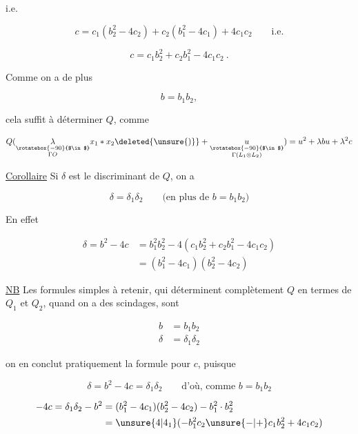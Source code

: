 

i.e. 

\[ c=c_1(b_2^2-4c_2)+c_2(b_1^2-4c_1)+4c_1c_2\qquad\text{i.e.} \]

\[ \boxed{c=c_1b_2^2+c_2b_1^2-4c_1c_2}\ . \]

Comme on a de plus

\[ \boxed{b=b_1b_2}, \]

cela suffit à déterminer $Q$, comme

\[ Q(\underset{\substack{\rotatebox{-90}{$\in$}\\\Gamma O}}{\lambda}x_1*x_2\deleted{\unsure{)}}+\underset{\substack{\rotatebox{-90}{$\in$}\\\Gamma(L_1\otimes L_2)}}{u})=u^2+\lambda bu+\lambda^2c \]

\uline{Corollaire} Si $\delta$ est le discriminant de $Q$, on a

\[ \delta=\delta_1\delta_2\qquad\text{(en plus de }b=b_1b_2\text{)} \]

En effet

\[ \begin{aligned}\delta=b^2-4c&=b_1^2 b_2^2-4(c_1b_2^2+c_2b_1^2-4c_1c_2)\\ &=(b_1^2-4c_1)(b_2^2-4c_2)\end{aligned} \]

\uline{NB} Les formules simples à retenir, qui déterminent complètement $Q$ en termes de $Q_1$ et $Q_2$, quand on a des scindages, sont

\[ \boxed{\begin{aligned} b&=b_1b_2\\\delta&=\delta_1\delta_2\end{aligned}} \]

on en conclut pratiquement la formule pour $c$, puisque

\[ \delta=b^2-4c=\delta_1\delta_2\qquad\text{d'où, comme }b=b_1b_2 \]

\[ \begin{aligned}-4c=\delta_1\delta_2-b^2&=(b_1^2-4c_1)(b_2^2-4c_2)-b_1^2\cdot b_2^2\\ &=\unsure{4|4_1}(-b_1^2c_2\unsure{-|+}c_1b_2^2+4c_1c_2)\end{aligned} \]
